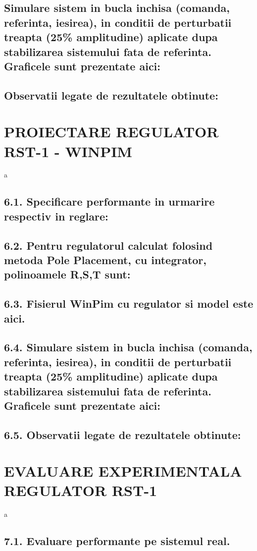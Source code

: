 \documentclass[12pt,english]{article}
\begin{document}
\subsection {Simulare sistem in bucla inchisa (comanda, referinta, iesirea), in conditii de perturbatii treapta (25\% amplitudine) aplicate dupa stabilizarea sistemului fata de referinta. Graficele sunt prezentate aici: }
\subsection {Observatii legate de rezultatele obtinute: }

\section {PROIECTARE REGULATOR RST-1 - WINPIM }
a
\subsection {6.1. Specificare performante in urmarire respectiv in reglare: }
\subsection {6.2. Pentru regulatorul calculat folosind metoda Pole Placement, cu integrator, polinoamele R,S,T sunt: }
\subsection {6.3. Fisierul WinPim cu regulator si model este aici. }
\subsection {6.4. Simulare sistem in bucla inchisa (comanda, referinta, iesirea), in conditii de perturbatii treapta (25\% amplitudine) aplicate dupa stabilizarea sistemului fata de referinta. Graficele sunt prezentate aici: }
\subsection {6.5. Observatii legate de rezultatele obtinute: }

\section {EVALUARE EXPERIMENTALA REGULATOR RST-1 }
a
\subsection {7.1. Evaluare performante pe sistemul real. }
\end{document}
